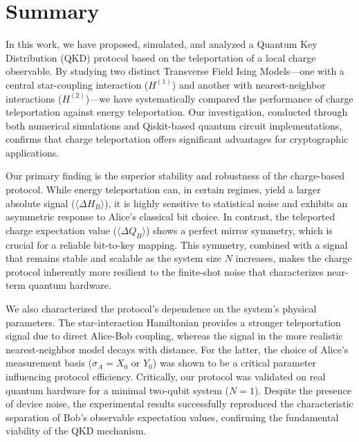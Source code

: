 \section{Summary}
\label{sec:summary}

In this work, we have proposed, simulated, and analyzed a Quantum Key Distribution (QKD) protocol based on the teleportation of a local charge observable. By studying two distinct Transverse Field Ising Models—one with a central star-coupling interaction ($H^{(1)}$) and another with nearest-neighbor interactions ($H^{(2)}$)—we have systematically compared the performance of charge teleportation against energy teleportation. Our investigation, conducted through both numerical simulations and Qiskit-based quantum circuit implementations, confirms that charge teleportation offers significant advantages for cryptographic applications.

Our primary finding is the superior stability and robustness of the charge-based protocol. While energy teleportation can, in certain regimes, yield a larger absolute signal ($\langle \Delta H_B \rangle$), it is highly sensitive to statistical noise and exhibits an asymmetric response to Alice's classical bit choice. In contrast, the teleported charge expectation value ($\langle \Delta Q_B \rangle$) shows a perfect mirror symmetry, which is crucial for a reliable bit-to-key mapping. This symmetry, combined with a signal that remains stable and scalable as the system size $N$ increases, makes the charge protocol inherently more resilient to the finite-shot noise that characterizes near-term quantum hardware.

We also characterized the protocol's dependence on the system's physical parameters. The star-interaction Hamiltonian provides a stronger teleportation signal due to direct Alice-Bob coupling, whereas the signal in the more realistic nearest-neighbor model decays with distance. For the latter, the choice of Alice's measurement basis ($\sigma_A = X_0$ or $Y_0$) was shown to be a critical parameter influencing protocol efficiency. Critically, our protocol was validated on real quantum hardware for a minimal two-qubit system ($N=1$). Despite the presence of device noise, the experimental results successfully reproduced the characteristic separation of Bob's observable expectation values, confirming the fundamental viability of the QKD mechanism.

